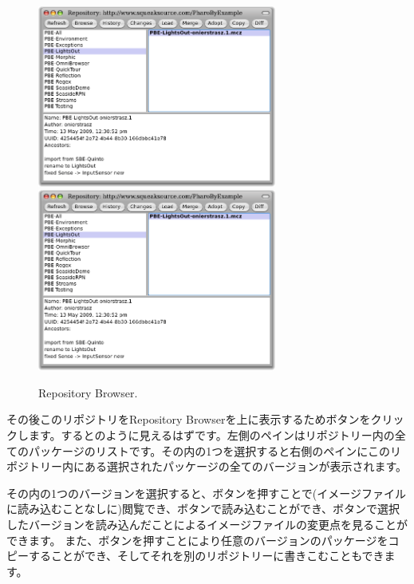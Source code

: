 \documentclass[a4paper,10pt,twoside]{book}
\begin{document}
\begin{figure}[btp]
	\begin{center}
	\ifluluelse
		{\includegraphics[width=0.7\textwidth]{SqueakSource-PBE}}
		{\includegraphics[width=0.7\textwidth]{SqueakSource-PBE}}
	\end{center}
	\caption{Repository Browser.}
\end{figure}
\noindent
その後このリポジトリをRepository Browserを上に表示するためボタンをクリックします。するとのように見えるはずです。左側のペインはリポジトリー内の全てのパッケージのリストです。その内の1つを選択すると右側のペインにこのリポジトリー内にある選択されたパッケージの全てのバージョンが表示されます。

その内の1つのバージョンを選択すると、ボタンを押すことで(イメージファイルに読み込むことなしに)閲覧でき、ボタンで読み込むことができ、ボタンで選択したバージョンを読み込んだことによるイメージファイルの変更点を見ることができます。 また、ボタンを押すことにより任意のバージョンのパッケージをコピーすることができ、そしてそれを別のリポジトリーに書きこむこともできます。
\end{document}

